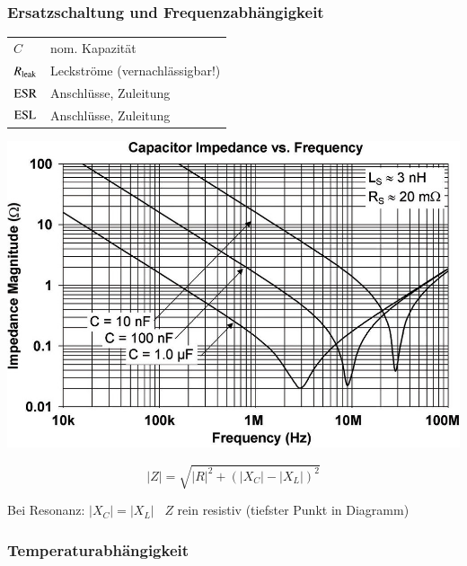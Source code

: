 \subsubsection{Ersatzschaltung und Frequenzabhängigkeit}

\begin{minipage}[c]{0.48\columnwidth}
    

    \begin{tabular}{ll@{}}
        $C$             & nom. Kapazität  \\
        $R_{\rm leak}$  & Leckströme (vernachlässigbar!) \\
        $\rm{ESR}$      & Anschlüsse, Zuleitung \\ 
        $\rm{ESL}$      & Anschlüsse, Zuleitung 
    \end{tabular}
\end{minipage}
\hfill
\begin{minipage}[c]{0.5\columnwidth}
    \includegraphics[width=\columnwidth]{images/realer_kondensator_frequenzverlauf.jpg}
\end{minipage}

\begin{minipage}[c]{0.48\columnwidth}
    $$ \boxed{ |Z| = \sqrt{|R|^2 + (|X_{C}| - |X_L|)^2 } } $$
\end{minipage}
\hfill
\begin{minipage}[c]{0.48\columnwidth}
    Bei Resonanz: $ |X_C| = |X_L|$ \textrightarrow\ $Z$ rein resistiv (tiefster Punkt in Diagramm)
\end{minipage}


\subsubsection{Temperaturabhängigkeit}


